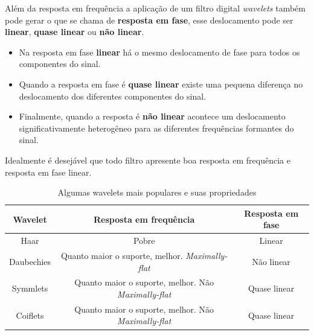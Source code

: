 \begin{myenv}{1.5}
				\par Além da resposta em frequência a aplicação de um filtro digital \textit{wavelets} também pode gerar o que se chama de \textbf{resposta em fase}, esse deslocamento pode ser \textbf{linear}, \textbf{quase linear} ou \textbf{não linear}. 
				
				\begin{itemize}
					\item Na resposta em fase \textbf{linear} há o mesmo deslocamento de fase para todos os componentes do sinal.
					\item Quando a resposta em fase é \textbf{quase linear} existe uma pequena diferença no deslocamento dos diferentes componentes do sinal.
					\item Finalmente, quando a resposta é \textbf{não linear} acontece um deslocamento significativamente heterogêneo para as diferentes frequências formantes do sinal.
					\end{itemize}
				
				\par Idealmente é desejável que todo filtro apresente boa resposta em frequência e resposta em fase linear.
				
				\begin{table}[h]
					\centering
					\begin{tabular}{|c|c|c|}
							\hline 
							\textbf{Wavelet} & \textbf{Resposta em frequência} & \textbf{Resposta em fase} \\ 
							\hline 
							Haar & Pobre &  Linear \\ 
							\hline 
							Daubechies & Quanto maior o suporte, melhor. \textit{Maximally-flat}  &  Não linear \\ 
							\hline 
							Symmlets & Quanto maior o suporte, melhor. Não \textit{Maximally-flat} & Quase linear \\ 
							\hline 
							Coiflets & Quanto maior o suporte, melhor. Não \textit{Maximally-flat} & Quase linear \\ 
							\hline 
					\end{tabular} 
					\caption{Algumas wavelets mais populares e suas propriedades}
					\label{tab:waveletsProperties}
				\end{table}
			

\end{myenv}
